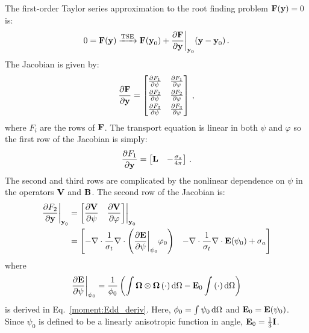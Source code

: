 \documentclass[../doc.tex]{subfiles}
\begin{document}
The first-order Taylor series approximation to the root finding problem $\F(\y) = 0$ is: 
	\begin{equation} \label{moment:smm_root}
		0 = \F(\y) \xrightarrow{\text{TSE}} \F(\y_0) + \pderiv{\F}{\y}\biggr\rvert_{\y_0}(\y - \y_0) \,. 
	\end{equation}
The Jacobian is given by: 
	\begin{equation}
		\pderiv{\F}{\y} = \begin{bmatrix} 
			\pderiv{F_1}{\psi} & \pderiv{F_1}{\varphi} \\[4pt] 
			\pderiv{F_2}{\psi} & \pderiv{F_2}{\varphi} \\[4pt] 
			\pderiv{F_3}{\psi} & \pderiv{F_3}{\varphi} 
		\end{bmatrix} \,,
	\end{equation}
where $F_i$ are the rows of $\F$. The transport equation is linear in both $\psi$ and $\varphi$ so the first row of the Jacobian is simply: 
	\begin{equation}
		\pderiv{F_1}{\y} = \begin{bmatrix} 
			\mat{L} & -\frac{\sigma_s}{4\pi} 
		\end{bmatrix} \,. 
	\end{equation}
The second and third rows are complicated by the nonlinear dependence on $\psi$ in the operators $\mat{V}$ and $\mat{B}$. The second row of the Jacobian is: 
	\begin{equation}
	\begin{aligned}
		\pderiv{F_2}{\y}\biggr\rvert_{\y_0} &= \begin{bmatrix} 
			\displaystyle\pderiv{\mat{V}}{\psi} & \displaystyle\pderiv{\mat{V}}{\varphi} 
		\end{bmatrix} \biggr\rvert_{\y_0} \\
		&= \begin{bmatrix} 
			\displaystyle-\nabla\cdot\frac{1}{\sigma_t}\nabla\cdot\paren{\pderiv{\E}{\psi}\biggr\rvert_{\psi_0}\varphi_0} & 
			\displaystyle-\nabla\cdot\frac{1}{\sigma_t}\nabla\cdot\E(\psi_0) + \sigma_a 
		\end{bmatrix} 
	\end{aligned}
	\end{equation}
where 
	\begin{equation}
	 	\pderiv{\E}{\psi}\biggr\rvert_{\psi_0} = \frac{1}{\phi_0}\paren{\int \Omegahat\otimes\Omegahat\paren{\cdot}\ud\Omega - \E_0\int \paren{\cdot}\ud\Omega}
	\end{equation} 
is derived in Eq.~\ref{moment:Edd_deriv}. Here, $\phi_0 = \int \psi_0 \ud \Omega$ and $\E_0 = \E(\psi_0)$. Since $\psi_0$ is defined to be a linearly anisotropic function in angle, $\E_0 = \frac{1}{3}\I$. 
\end{document}
